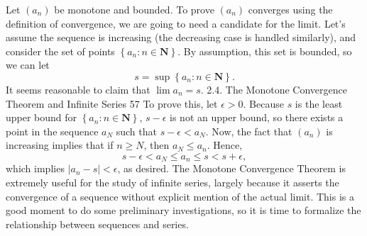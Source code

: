 \documentclass{report}
\begin{document}

\begin{myproof}
Let $\left(a_n\right)$ be monotone and bounded. To prove $\left(a_n\right)$ converges using the definition of convergence, we are going to need a candidate for the limit. Let's assume the sequence is increasing (the decreasing case is handled similarly), and consider the set of points $\left\{a_n: n \in \mathbf{N}\right\}$. By assumption, this set is bounded, so we can let
$$
s=\sup \left\{a_n: n \in \mathbf{N}\right\} .
$$
It seems reasonable to claim that $\lim a_n=s$.
2.4. The Monotone Convergence Theorem and Infinite Series
57
To prove this, let $\epsilon>0$. Because $s$ is the least upper bound for $\left\{a_n: n \in \mathbf{N}\right\}$, $s-\epsilon$ is not an upper bound, so there exists a point in the sequence $a_N$ such that $s-\epsilon<a_N$. Now, the fact that $\left(a_n\right)$ is increasing implies that if $n \geq N$, then $a_N \leq a_n$. Hence,
$$
s-\epsilon<a_N \leq a_n \leq s<s+\epsilon,
$$
which implies $\left|a_n-s\right|<\epsilon$, as desired.
The Monotone Convergence Theorem is extremely useful for the study of infinite series, largely because it asserts the convergence of a sequence without explicit mention of the actual limit. This is a good moment to do some preliminary investigations, so it is time to formalize the relationship between sequences and series.
\end{myproof}



\pagebreak




















 
\end{document}
